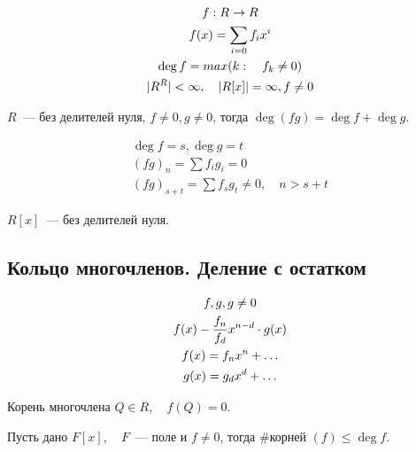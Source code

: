 \begin{definition}
  \begin{gather}
    f: R \rightarrow R \\
    f(x) = \sum_{i = 0} f_i x^i \\
    \deg f = max(k: \quad f_k \neq 0) \\
    |R^R| < \infty, \quad |R[x]| = \infty, f \neq 0
  \end{gather}
\end{definition}

\begin{lemma}
  $R$~--- без делителей нуля, $f \neq 0, g \neq 0$, тогда $\deg(fg) = \deg f + \deg g$.
\end{lemma}

\begin{example}
  \begin{gather}
    \deg f = s, \deg g = t \\
    (fg)_n = \sum f_i g_i = 0 \\
    (fg)_{s + t} = \sum f_s g _t \neq 0, \quad n > s + t
  \end{gather}
\end{example}

\begin{corollary}
  $R[x]$~--- без делителей нуля.
\end{corollary}

\subsection{Кольцо многочленов. Деление с остатком}

\begin{gather}
  f, g, g \neq 0 \\
  f(x) - \frac{f_n}{f_d}x^{n - d} \cdot g(x) \\
  f(x) = f_n x^n + \dots \\
  g(x) = g_d x^d + \dots
\end{gather}

\begin{proposition}
  Корень многочлена $Q \in R, \quad f(Q) = 0$.
\end{proposition}

\begin{lemma}
  Пусть дано $F[x], \quad F$~--- поле и $f \neq 0$, тогда \#корней $(f) \leq \deg f$.
\end{lemma}

